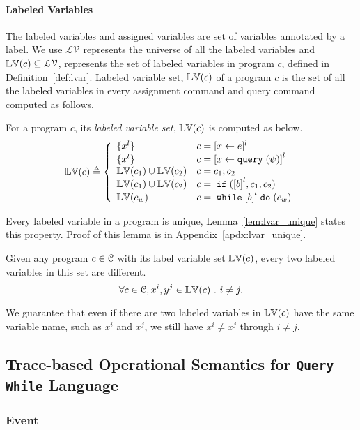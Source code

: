 \paragraph{Labeled Variables}
The labeled variables and assigned variables are set of variables annotated by a label. 
We use 
$\mathcal{LV}$ represents the universe of all the labeled variables and 
$\mathbb{LV}(c) \subseteq \mathcal{LV}$,
represents the set of labeled variables in program $c$,
defined in Definition~\ref{def:lvar}.
Labeled variable set, $\mathbb{LV}(c)$ of a program $c$ is the set of all the labeled variables in every assignment command
and query command computed as follows.
%
\begin{defn}
 \label{def:lvar}
For a program $c$, its \emph{labeled variable set}, $\mathbb{LV}(c)$ is computed as below.
 {
 \[
 \lvar(c) \triangleq
 \left\{
 \begin{array}{ll}
 \{{x}^l\} 
 & {c} = [{\assign x e}]^{l} 
 \\
 \{{x}^l\} 
 & {c} = \clabel{\assign x \query(\qexpr)}^{l} 
 \\
 \lvar(c_1) \cup \lvar(c_2) 
 & {c} = {c_1};{c_2}
 \\
 \lvar(c_1) \cup \lvar(c_2)
 & {c} =\eif(\clabel{\bexpr}^{l}, c_1, c_2) 
 \\
 \lvar(c_w)
 & {c} = \ewhile \clabel{\bexpr}^{l} \edo (c_w)
 \end{array}
 \right.
 \]
 }
 \end{defn}
%

%
%
Every labeled variable in a program is unique, 
Lemma~\ref{lem:lvar_unique} states this property.
Proof of this lemma is in Appendix~\ref{apdx:lvar_unique}.
\begin{lem}
 \label{lem:lvar_unique}
 Given any program $c \in \mathcal{C}$ with its label variable set $\mathbb{LV}(c)$,
 every two labeled variables in this set are different.
 \[
 \forall c \in \mathcal{C}, x^i, y^j \in \mathbb{LV}(c) ~.~ i \neq j.
 \]
\end{lem}
We guarantee that even if there are two labeled variables in $\mathbb{LV}(c)$ have the same variable name,
such as $x^i$ and $x^j$, we still have $x^i \neq x^j$ through $i \neq j$.
%
%

\subsection{Trace-based Operational Semantics for {\tt Query While} Language}

\subsubsection{Event}



